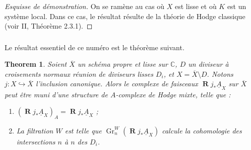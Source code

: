 \documentclass[11pt]{amsart}
\theoremstyle{plain}
\newtheorem{theorem}{Theorem}[section]
\theoremstyle{definition}
\DeclareMathOperator{\Gr}{Gr}
\DeclareMathOperator{\Rd}{\mathbf{R}}
\newcommand{\CC}{\mathbb{C}}
\begin{document}
\begin{proof}[Esquisse de d\'emonstration]
On se ram\`ene au cas o\`u $X$ est lisse et o\`u $K$ est un syst\`eme local. Dans ce cas, le r\'esultat r\'esulte de la th\'eorie de Hodge classique (voir II, Th\'eor\`eme 2.3.1).
\end{proof}

\subsubsection{}
Le r\'esultat essentiel de ce num\'ero est le th\'eor\`eme suivant.

\begin{theorem}\label{thm:8.1.15}
Soient $\overline{X}$ un sch\'ema propre et lisse sur $\CC$, $D$ un diviseur \`a croisements normaux r\'eunion de diviseurs lisses $D_i$, et $X = \overline{X} \setminus D$. Notons $j : X \hookrightarrow \overline{X}$ l'inclusion canonique. Alors le complexe de faisceaux $\Rd j_* \underline{A}_X$ sur $\overline{X}$ peut \^etre muni d'une structure de $A$-complexe de Hodge mixte, telle que :
\begin{enumerate}
\item[(i)] $(\Rd j_* \underline{A}_X)_A = \Rd j_* \underline{A}_X$ ;
\item[(ii)] La filtration $W$ est telle que $\Gr_n^W(\Rd j_* \underline{A}_X)$ calcule la cohomologie des intersections $n$ \`a $n$ des $D_i$.
\end{enumerate}
\end{theorem}
\end{document}
